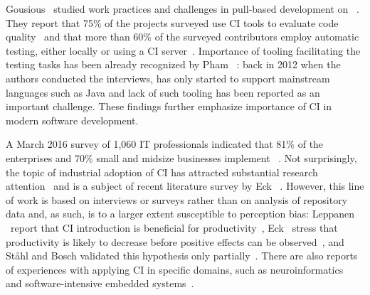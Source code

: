 
Gousious \etal\ studied work practices and challenges in pull-based
development on \GH~\cite{gousios2015work, gousios2016work}. 
They report that 75\% of the projects surveyed use CI tools to evaluate
code quality~\cite{gousios2015work} and that more than 60\% of the surveyed 
contributors employ automatic testing, either locally or using a CI server~\cite{gousios2016work}. 
Importance of tooling facilitating the testing tasks has been already recognized by 
Pham \etal~\cite{pham2013creating}: back in 2012 when the authors conducted
the interviews, \Tvis has only started to support mainstream languages such as Java 
and lack of such tooling has been reported as an important challenge.
These findings further emphasize importance of CI in modern software development. 

A March 2016 survey of 1,060 IT professionals indicated that 81\% of the enterprises 
and 70\% small and midsize businesses implement \DO~\cite{rightscale}. 
Not surprisingly, the topic of industrial adoption of CI 
has attracted substantial research attention~\cite{hilton2016continuous,Leppanen2015,Laukkanen2015Agile,Debbiche2014,Stahl2014ICSEComp,Stahl2014JSS,Stahl2013Experienced} and is a subject of recent literature survey by Eck \etal~\cite{EckUB14}. 
However, this line of work is based on interviews or surveys rather than on 
analysis of repository data and, as such, is to a larger extent susceptible to 
perception bias: \eg Leppanen \etal\ report that
CI introduction is beneficial for productivity~\cite{Leppanen2015}, 
Eck \etal\ stress that productivity is likely to decrease before positive effects can be observed~\cite{EckUB14},
and St{\aa}hl and Bosch validated this hypothesis only partially~\cite{Stahl2013Experienced}.
%
There are also reports of experiences with applying CI in specific domains,
such as neuroinformatics~\cite{Zaytsev:Morrison} and software-intensive
embedded systems~\cite{Martensson2016}.

